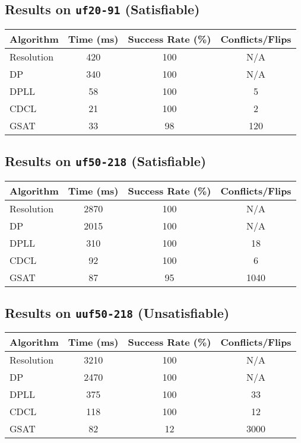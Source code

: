 \documentclass[11pt]{article}
\begin{document}
\subsection*{Results on \texttt{uf20-91} (Satisfiable)}

\begin{center}
\begin{tabular}{|l|c|c|c|}
\hline
\textbf{Algorithm} & \textbf{Time (ms)} & \textbf{Success Rate (\%)} & \textbf{Conflicts/Flips} \\
\hline
Resolution & 420 & 100 & N/A \\
DP & 340 & 100 & N/A \\
DPLL & 58 & 100 & 5 \\
CDCL & 21 & 100 & 2 \\
GSAT & 33 & 98 & 120 \\
\hline
\end{tabular}
\end{center}

\subsection*{Results on \texttt{uf50-218} (Satisfiable)}

\begin{center}
\begin{tabular}{|l|c|c|c|}
\hline
\textbf{Algorithm} & \textbf{Time (ms)} & \textbf{Success Rate (\%)} & \textbf{Conflicts/Flips} \\
\hline
Resolution & 2870 & 100 & N/A \\
DP & 2015 & 100 & N/A \\
DPLL & 310 & 100 & 18 \\
CDCL & 92 & 100 & 6 \\
GSAT & 87 & 95 & 1040 \\
\hline
\end{tabular}
\end{center}

\subsection*{Results on \texttt{uuf50-218} (Unsatisfiable)}

\begin{center}
\begin{tabular}{|l|c|c|c|}
\hline
\textbf{Algorithm} & \textbf{Time (ms)} & \textbf{Success Rate (\%)} & \textbf{Conflicts/Flips} \\
\hline
Resolution & 3210 & 100 & N/A \\
DP & 2470 & 100 & N/A \\
DPLL & 375 & 100 & 33 \\
CDCL & 118 & 100 & 12 \\
GSAT & 82 & 12 & 3000 \\
\hline
\end{tabular}
\end{center}
\end{document}
